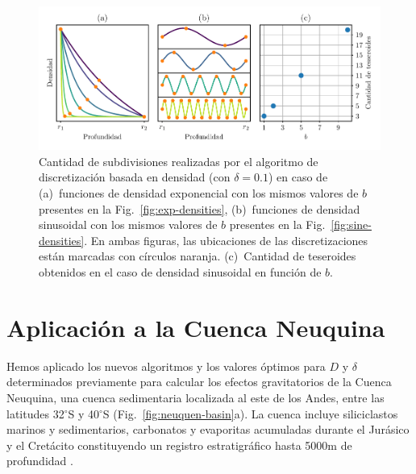 \begin{figure}
\centering
\includegraphics[width=\linewidth]{figs/tesseroids-variable-density/number-of-tesseroids.pdf}
\caption{
    Cantidad de subdivisiones realizadas por el algoritmo de discretización
    basada en densidad (con $\delta = 0.1$) en caso de
    (a)~funciones de densidad exponencial con los mismos valores de $b$
    presentes en la Fig.~\ref{fig:exp-densities},
    (b)~funciones de densidad sinusoidal con los mismos valores de $b$
    presentes en la Fig.~\ref{fig:sine-densities}.
    En ambas figuras, las ubicaciones de las discretizaciones están marcadas
    con círculos naranja.
    (c)~Cantidad de teseroides obtenidos en el caso de densidad sinusoidal en
    función de $b$.
}
\label{fig:number-of-tesseroids}
\end{figure}



\section{Aplicación a la Cuenca Neuquina}

Hemos aplicado los nuevos algoritmos y los valores óptimos para $D$
y $\delta$ determinados previamente para calcular los efectos gravitatorios de
la Cuenca Neuquina, una cuenca sedimentaria localizada al este de los Andes,
entre las latitudes 32$^\circ$S y 40$^\circ$S (Fig.~\ref{fig:neuquen-basin}a).
La cuenca incluye siliciclastos marinos y sedimentarios, carbonatos
y evaporitas acumuladas durante el Jurásico y el Cretácito constituyendo un
registro estratigráfico hasta 5000m de profundidad \citep{howell2005}.

